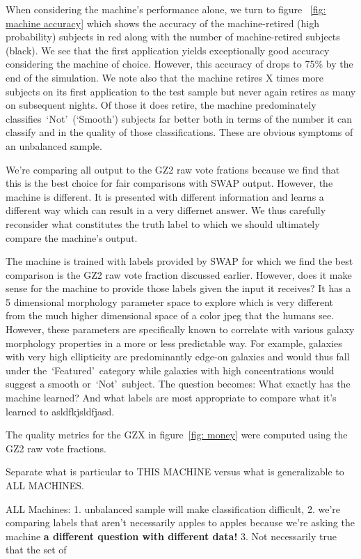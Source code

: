 \documentclass[twocolumn]{aastex6}
\newcommand{\feat}{`Featured'}
\newcommand{\notfeat}{`Not'}
\begin{document}
When considering the machine's performance alone, we turn to figure
~\ref{fig: machine accuracy} which shows the accuracy of the machine-retired
 (high probability) subjects in red along with the number of machine-retired subjects (black). 
We see that the first application yields exceptionally good accuracy considering
the machine of choice. However, this accuracy of drops to 75\% by the end of the simulation.
We note also that the machine retires X times more subjects on its first 
application to the test sample but never again retires as many on subsequent nights. 
Of those it does retire, the machine predominately classifies~\notfeat~(`Smooth') subjects
far better both in terms of the number it can classify and in the quality of those classifications. 
These are obvious symptoms of an unbalanced sample. 


We're comparing all output to the GZ2 raw vote frations because we find that this is 
the best choice for fair comparisons with SWAP output. However, the machine is different.
It is presented with different information and learns a different way which can result in 
a very differnet answer. We thus carefully reconsider what constitutes the truth label to
which we should ultimately compare the machine's output. 

The machine is trained with labels provided by SWAP for which we find the best comparison 
is the GZ2 raw vote fraction discussed earlier. However, does it make sense 
for the machine to provide those labels given the input it receives? It has a 5 dimensional 
morphology parameter space to explore which is very different from the much higher
dimensional space of a color jpeg that the humans see. However, these parameters are
specifically known to correlate with various galaxy morphology properties in a more or less
predictable way. For example, galaxies with very high ellipticity are predominantly 
edge-on galaxies and would thus fall under the~\feat~category while galaxies with 
high concentrations would suggest a smooth or~\notfeat~subject. 
The question becomes: What exactly has the machine learned? And what labels are 
most appropriate to compare what it's learned to asldfkjsldfjasd. 
 
The quality metrics for the GZX in figure~\ref{fig: money} were computed using the 
GZ2 raw vote fractions. 


Separate what is particular to THIS MACHINE versus what is generalizable to ALL MACHINES.

ALL Machines: 1. unbalanced sample will make classification difficult, 2. we're comparing labels
that aren't necessarily apples to apples because we're asking the machine \textbf{a different question with different data!} 3. Not necessarily true that the set of 
\end{document}
